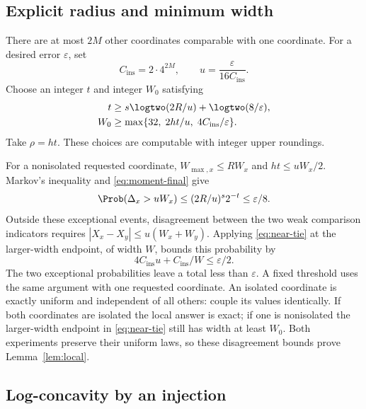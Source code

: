\subsection{Explicit radius and minimum width}
\label{app:radius}

There are at most $2M$ other coordinates comparable with one coordinate.
For a desired error $\varepsilon$, set
\begin{equation}
             C_{\mathrm{ins}}=2\cdot4^{2M},\qquad
             u=\frac{\varepsilon}{16C_{\mathrm{ins}}}.
\label{eq:prob-constants}
\end{equation}
Choose an integer $t$ and integer $W_0$ satisfying
\begin{align}
t&\geq s\logtwo(2R/u)+\logtwo(8/\varepsilon),\label{eq:t}\\
W_0&\geq\max\{32,\;2ht/u,\;4C_{\mathrm{ins}}/\varepsilon\}.
\label{eq:w0}
\end{align}
Take $\rho=ht$. These choices are computable with integer upper roundings.

For a nonisolated requested coordinate, $W_{\max,x}\leq RW_x$ and
$ht\leq uW_x/2$. Markov's inequality and \eqref{eq:moment-final} give
\begin{equation}
       \Prob(\Delta_x>uW_x)
       \leq(2R/u)^s2^{-t}\leq\varepsilon/8.
\label{eq:coordinate-error}
\end{equation}
Outside these exceptional events, disagreement between the two weak
comparison indicators requires
$|X_x-X_y|\leq u(W_x+W_y)$. Applying \eqref{eq:near-tie} at the
larger-width endpoint, of width $W$, bounds this probability by
\[
                  4C_{\mathrm{ins}}u+C_{\mathrm{ins}}/W
                  \leq\varepsilon/2.
\]
The two exceptional probabilities leave a total less than $\varepsilon$.
A fixed threshold uses the same argument with one requested coordinate.
An isolated coordinate is exactly uniform and independent of all others:
couple its values identically. If both coordinates are isolated the local
answer is exact; if one is nonisolated the larger-width endpoint in
\eqref{eq:near-tie} still has width at least $W_0$.
Both experiments preserve their uniform laws, so these disagreement bounds
prove Lemma~\ref{lem:local}.

\subsection{Log-concavity by an injection}
\label{app:logconcavity}

